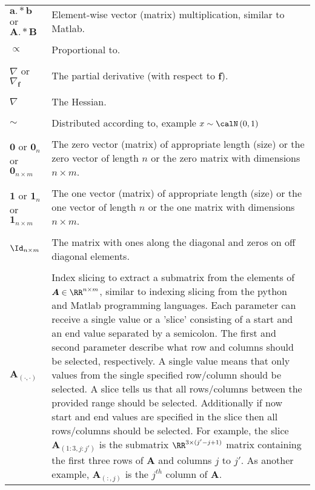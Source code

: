 \begin{longtable}{lp{}}
    $\bm{a} .\ast \bm{b}$ or $\bm{A} .\ast \bm{B}$                                                             & Element-wise vector (matrix) multiplication, similar to Matlab.
    \\\\
    $\propto$                                                                                                  & Proportional to.
    \\\\
    $\nabla$ or $\nabla_{\bm{f}}$                                                                              & The partial derivative (with respect to $\bm{f}$).
    \\\\
    $\nabla$                                                                                                   & The Hessian.
    \\\\
    $\sim$                                                                                                     & Distributed according to, example $x \sim \calN \left( 0,1 \right)$
    \\\\
    $\bm{0}$ or $\bm{0}_{n}$ or $\bm{0}_{n \times m}$                                                          & The zero vector (matrix) of appropriate length (size) or the zero vector of length $n$ or the zero matrix with dimensions $n \times m$.
    \\\\
    $\bm{1}$ or $\bm{1}_{n}$ or $\bm{1}_{n \times m}$                                                          & The one vector (matrix) of appropriate length (size) or the one vector of length $n$ or the one matrix with dimensions $n \times m$.
    \\\\
    $\Id_{n \times m}$                                                                                         & The matrix with ones along the diagonal and zeros on off diagonal elements.
    \\\\
    $\bm{A}_{(\cdot,\cdot)}$                                                                                   & Index slicing to extract a submatrix from the elements of $\bm{A} \in \RR^{n \times m}$, similar to indexing slicing from the python and Matlab programming languages. Each parameter can receive a single value or a 'slice' consisting of a start and an end value separated by a semicolon. The first and second parameter describe what row and columns should be selected, respectively. A single value means that only values from the single specified row/column should be selected. A slice tells us that all rows/columns between the provided range should be selected. Additionally if now start and end values are specified in the slice then all rows/columns should be selected. For example, the slice $\bm{A}_{(1:3,j:j')}$ is the submatrix $\RR^{3 \times (j' - j + 1)}$ matrix containing the first three rows of $\bm{A}$ and columns $j$ to $j'$. As another example, $\bm{A}_{(:,j)}$ is the $j^{th}$ column of $\bm{A}$.

\end{longtable}
